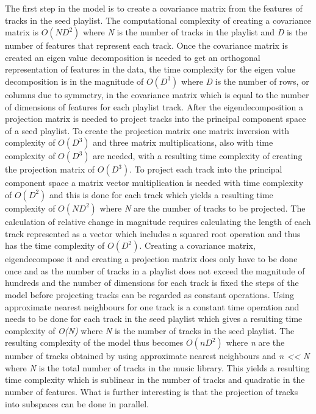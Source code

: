 \documentclass[a4paper,11pt]{kth-mag}
\begin{document}
The first step in the model is to create a covariance matrix from the features of tracks in the seed playlist. The computational complexity of creating a covariance matrix is $O(ND^2)$ where \textit{N} is the number of tracks in the playlist and \textit{D} is the number of features that represent each track\cite{kwatra2010fast}. Once the covariance matrix is created an eigen value decomposition is needed to get an orthogonal representation of features in the data, the time complexity for the eigen value decomposition is in the magnitude of $O(D^3)$ where \textit{D} is the number of rows, or columns due to symmetry, in the covariance matrix which is equal to the number of dimensions of features for each playlist track\cite{pan1999complexity}. After the eigendecomposition a projection matrix is needed to project tracks into the principal component space of a seed playlist. To create the projection matrix one matrix inversion with complexity of $O(D^3)$ and three matrix multiplications, also with time complexity of $O(D^3)$ are needed, with a resulting time complexity of creating the projection matrix of $O(D^3)$. To project each track into the principal component space a matrix vector multiplication is needed with time complexity of $O(D^2)$ and this is done for each track which yields a resulting time complexity of $O(ND^2)$ where \textit{N} are the number of tracks to be projected. The calculation of relative change in magnitude requires calculating the length of each track represented as a vector which includes a squared root operation and thus has the time complexity of $O(D^2)$. Creating a covariance matrix, eigendecompose it and creating a projection matrix does only have to be done once and as the number of tracks in a playlist does not exceed the magnitude of hundreds and the number of dimensions for each track is fixed the steps of the model before projecting tracks can be regarded as constant operations. Using approximate nearest neighbours for one track is a constant time operation and needs to be done for each track in the seed playlist which gives a resulting time complexity of \textit{O(N)} where \textit{N} is the number of tracks in the seed playlist. The resulting complexity of the model thus becomes $O(nD^2)$ where \textit{n} are the number of tracks obtained by using approximate nearest neighbours and \textit{n << N} where \textit{N} is the total number of tracks in the music library. This yields a resulting time complexity which is sublinear in the number of tracks and quadratic in the number of features. What is further interesting is that the projection of tracks into subspaces can be done in parallel. 
 
\end{document}
